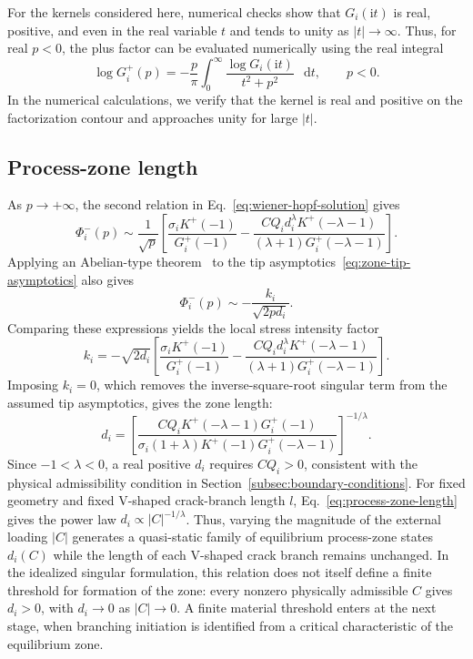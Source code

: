 \documentclass[pdflatex,onecolumn,sn-mathphys-ay]{sn-jnl}
\newcommand{\dd}{\mathop{}\!\mathrm{d}}
\newcommand{\ii}{\mathrm{i}}
\begin{document}
For the kernels considered here, numerical checks show that
$G_i(\ii t)$ is real, positive, and even in the real variable $t$ and
tends to unity as $|t|\to\infty$.
Thus, for real $p<0$, the plus factor can be evaluated numerically
using the real integral
\begin{equation*}
  \log G_i^+(p)
  =-\frac{p}{\pi}\int_0^\infty
    \frac{\log G_i(\ii t)}{t^2+p^2}\,\dd t,
  \qquad p<0.
\end{equation*}
In the numerical calculations, we verify that the kernel is real and
positive on the factorization contour and approaches unity for large
$|t|$.

\subsection{Process-zone length}
\label{subsec:zone-length}

As $p\to+\infty$, the second relation in
Eq.~\eqref{eq:wiener-hopf-solution} gives
\begin{equation*}
  \Phi_i^-(p)\sim\frac{1}{\sqrt{p}}
  \left[
    \frac{\sigma_iK^+(-1)}{G_i^+(-1)}
    -\frac{CQ_i d_i^\lambda K^+(-\lambda-1)}
    {(\lambda+1)G_i^+(-\lambda-1)}
  \right].
\end{equation*}
Applying an Abelian-type theorem~\citep{noble1958wienerhopf} to the
tip asymptotics~\eqref{eq:zone-tip-asymptotics} also gives
\begin{equation*}
  \Phi_i^-(p)\sim-\frac{k_i}{\sqrt{2pd_i}}.
\end{equation*}
Comparing these expressions yields the local stress intensity factor
\begin{equation*}
  k_i=-\sqrt{2d_i}
  \left[
    \frac{\sigma_iK^+(-1)}{G_i^+(-1)}
    -\frac{CQ_i d_i^\lambda K^+(-\lambda-1)}
    {(\lambda+1)G_i^+(-\lambda-1)}
  \right].
\end{equation*}
Imposing $k_i=0$, which removes the inverse-square-root singular term
from the assumed tip asymptotics, gives the zone length:
\begin{equation}
\label{eq:process-zone-length}
  d_i=
  \left[
    \frac{CQ_iK^+(-\lambda-1)G_i^+(-1)}
    {\sigma_i(1+\lambda)K^+(-1)G_i^+(-\lambda-1)}
  \right]^{-1/\lambda}.
\end{equation}
Since $-1<\lambda<0$, a real positive $d_i$ requires $CQ_i>0$,
consistent with the physical admissibility condition in
Section~\ref{subsec:boundary-conditions}. For fixed geometry and fixed
V-shaped crack-branch length $l$, Eq.~\eqref{eq:process-zone-length}
gives the power law
$d_i\propto |C|^{-1/\lambda}$. Thus, varying the magnitude of the
external loading $|C|$ generates a quasi-static family of equilibrium
process-zone states $d_i(C)$ while the length of each V-shaped crack
branch remains unchanged. In the idealized singular formulation, this
relation does not itself define a finite threshold for formation of the
zone: every nonzero physically admissible $C$ gives $d_i>0$, with
$d_i\to0$ as $|C|\to0$. A finite material threshold enters at the next
stage, when branching initiation is identified from a critical
characteristic of the equilibrium zone.
\end{document}
